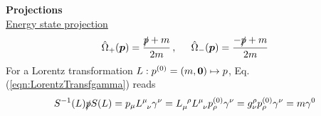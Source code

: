 \bigskip
\noindent
{\bf Projections}\\
\underline{Energy state projection}
\begin{eqnarray}
\hat{\Omega}_+(\mbox{\boldmath $p$})
=
\frac{\slashed{p} + m}{2m}
\,, \hspace{5mm}
\hat{\Omega}_-(\mbox{\boldmath $p$})
=
\frac{- \slashed{p} + m}{2m}
\end{eqnarray}
For a Lorentz transformation $L: p^{(0)} = (m, \mbox{\boldmath $0$}) \mapsto p$, 
Eq. (\ref{eqn:LorentzTransfgamma}) reads
\begin{eqnarray*}
S^{-1}(L) \slashed{p} S(L)
=
p_\mu L^\mu_{\;\;\nu} \gamma^\nu
=
L_\mu^{\;\;\rho} L^\mu_{\;\;\nu} p^{(0)}_\rho \gamma^\nu
=
g^\rho_\nu p^{(0)}_\rho \gamma^\nu
=
m \gamma^0
\end{eqnarray*}

